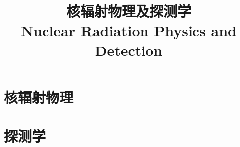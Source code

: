 \documentclass{../thunote}
\begin{document}
\title{核辐射物理及探测学\\Nuclear Radiation Physics and Detection}
\maketitle

\frontmatter
\tableofcontents
\listoffigures
\listoftables



\mainmatter
\part{核辐射物理}







\part{探测学}








\appendix

\end{document}
